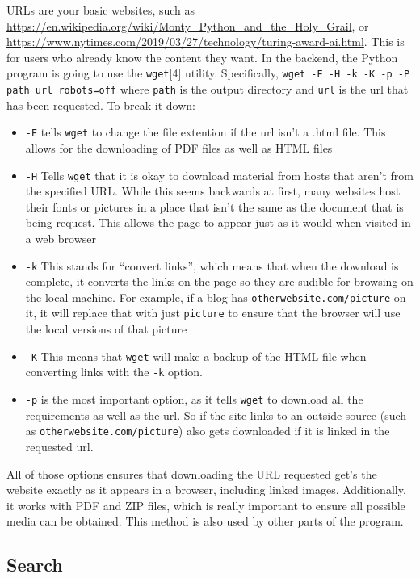 \documentclass{article}
\begin{document}
URLs are your basic websites, such as
\url{https://en.wikipedia.org/wiki/Monty_Python_and_the_Holy_Grail},
or
\url{https://www.nytimes.com/2019/03/27/technology/turing-award-ai.html}. This
is for users who already know the content they want. In the backend,
the Python program is going to use the \texttt{wget}[4]
utility. Specifically, \texttt{wget -E -H -k -K -p -P path url
  robots=off} where \texttt{path} is the output directory and
\texttt{url} is the url that has been requested. To break it down:
\begin{itemize}
  \item \texttt{-E} tells \texttt{wget} to change the file extention
    if the url isn't a .html file. This allows for the downloading of
    PDF files as well as HTML files
  \item \texttt{-H} Tells \texttt{wget} that it is okay to download
    material from hosts that aren't from the specified URL. While this
    seems backwards at first, many websites host their fonts or
    pictures in a place that isn't the same as the document that is
    being request. This allows the page to appear just as it would
    when visited in a web browser
  \item \texttt{-k} This stands for ``convert links'', which means
    that when the download is complete, it converts the links on the
    page so they are sudible for browsing on the local machine. For
    example, if a blog has \texttt{otherwebsite.com/picture} on it, it
    will replace that with just \texttt{picture} to ensure that the
    browser will use the local versions of that picture
  \item \texttt{-K} This means that \texttt{wget} will make a backup
    of the HTML file when converting links with the \texttt{-k}
    option.
  \item \texttt{-p} is the most important option, as it tells
    \texttt{wget} to download all the requirements as well as the
    url. So if the site links to an outside source (such as
    \texttt{otherwebsite.com/picture}) also gets downloaded if it is
    linked in the requested url.
  \end{itemize}
All of those options ensures that downloading the URL requested get's
the website exactly as it appears in a browser, including linked
images. Additionally, it works with PDF and ZIP files, which is really
important to ensure all possible media can be obtained. This method is
also used by other parts of the program.

\subsection{Search}
\end{document}
